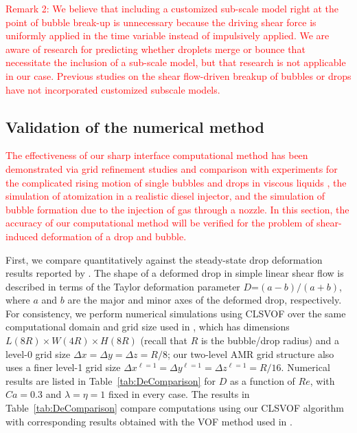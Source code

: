 \documentclass{elsarticle}
\newcommand{\lwh}[3]{L(#1R)\times W(#2R) \times H(#3R)}
\begin{document}
\par
\textcolor{red}
{
Remark 2: We believe that including a customized sub-scale model right at the point of bubble break-up is unnecessary because the driving shear force is uniformly applied in the time variable instead of impulsively applied.  We are aware of research for predicting whether droplets merge or bounce\cite{Lewin-Jones_Lockerby_Sprittles_2024} that necessitate the inclusion of a sub-scale model, but that research is not applicable in our case.  Previous studies on the shear flow-driven breakup of bubbles or drops have not incorporated customized subscale models\cite{LiRenRen00,KomShaEskDer14,AmaBalCasOli19}.
}

\subsection{Validation of the numerical method}
\textcolor{red}
{
	The effectiveness of our sharp interface computational method has been demonstrated via grid refinement studies and comparison with experiments for the complicated rising motion of single bubbles and drops in viscous liquids \citet{OhtSus12, OhtAkaYosSus14, OhtFurYosSus19,ohta2010sensitivity,stewart2008improved,SusSmiHusOhtZhi07}, the simulation of atomization in a realistic diesel injector\cite{arienti2013coupled}, and the simulation of bubble formation due to the injection of gas through a nozzle\cite{ohta2011robust}.  In this section, the accuracy of our computational method will be verified for the problem of shear-induced deformation of a drop and bubble. 
}
\par
       First, we compare quantitatively against the steady-state drop deformation results reported by \citet{LiRenRen00}.  The shape of a deformed drop in simple linear shear flow is described in terms of the Taylor deformation parameter $D$=$(a-b)/(a+b)$, where $a$ and $b$ are the major and minor axes of the deformed drop, respectively.  For consistency, we perform numerical simulations using CLSVOF over the same computational domain and grid size used in \citet{LiRenRen00}, which has dimensions $\lwh{8}{4}{8}$ (recall that $R$ is the bubble/drop radius) and a level-0 grid size $\Delta x=\Delta y=\Delta z=R/8$; our two-level AMR grid structure also uses a finer level-1 grid size $\Delta x^{\ell=1} = \Delta y^{\ell=1} = \Delta z^{\ell=1} = R/16$.  Numerical results are listed in Table~\ref{tab:DeComparison} for $D$ as a function of $Re$, with $Ca=0.3$ and $\lambda = \eta = 1$ fixed in every case.  The results in Table~\ref{tab:DeComparison} compare computations using our CLSVOF algorithm with corresponding results obtained with the VOF method used in \citet{LiRenRen00}.  
\end{document}
